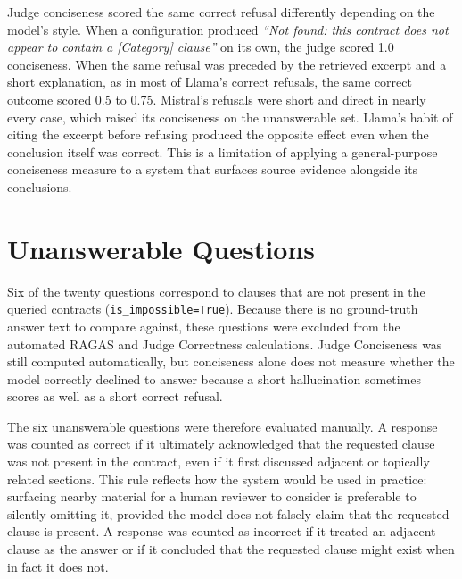 
Judge conciseness scored the same correct refusal differently depending on the model's style. When a configuration produced \textit{``Not found: this contract does not appear to contain a [Category] clause''} on its own, the judge scored 1.0 conciseness. When the same refusal was preceded by the retrieved excerpt and a short explanation, as in most of Llama's correct refusals, the same correct outcome scored 0.5 to 0.75. Mistral's refusals were short and direct in nearly every case, which raised its conciseness on the unanswerable set. Llama's habit of citing the excerpt before refusing produced the opposite effect even when the conclusion itself was correct. This is a limitation of applying a general-purpose conciseness measure to a system that surfaces source evidence alongside its conclusions.

\section{Unanswerable Questions}

Six of the twenty questions correspond to clauses that are not present in the queried contracts (\texttt{is\_impossible=True}). Because there is no ground-truth answer text to compare against, these questions were excluded from the automated RAGAS and Judge Correctness calculations. Judge Conciseness was still computed automatically, but conciseness alone does not measure whether the model correctly declined to answer because a short hallucination sometimes scores as well as a short correct refusal.

The six unanswerable questions were therefore evaluated manually. A response was coun\-ted as correct if it ultimately acknowledged that the requested clause was not present in the contract, even if it first discussed adjacent or topically related sections. This rule reflects how the system would be used in practice: surfacing nearby material for a human reviewer to consider is preferable to silently omitting it, provided the model does not falsely claim that the requested clause is present. A response was counted as incorrect if it treated an adjacent clause as the answer or if it concluded that the requested clause might exist when in fact it does not.

